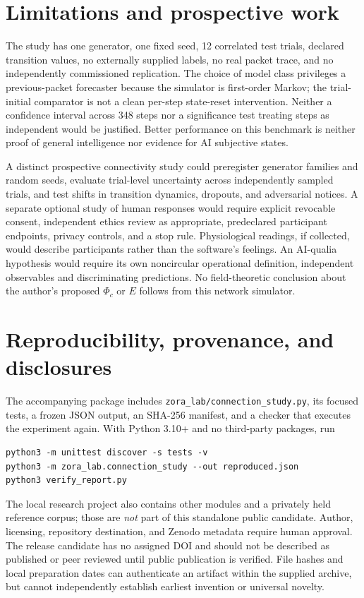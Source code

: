 \documentclass[11pt,a4paper]{article}
\begin{document}
\section{Limitations and prospective work}
The study has one generator, one fixed seed, 12 correlated test trials, declared transition values, no externally supplied labels, no real packet trace, and no independently commissioned replication. The choice of model class privileges a previous-packet forecaster because the simulator is first-order Markov; the trial-initial comparator is not a clean per-step state-reset intervention. Neither a confidence interval across 348 steps nor a significance test treating steps as independent would be justified. Better performance on this benchmark is neither proof of general intelligence nor evidence for AI subjective states.

A distinct prospective connectivity study could preregister generator families and random seeds, evaluate trial-level uncertainty across independently sampled trials, and test shifts in transition dynamics, dropouts, and adversarial notices. A separate optional study of human responses would require explicit revocable consent, independent ethics review as appropriate, predeclared participant endpoints, privacy controls, and a stop rule. Physiological readings, if collected, would describe participants rather than the software's feelings. An AI-qualia hypothesis would require its own noncircular operational definition, independent observables and discriminating predictions. No field-theoretic conclusion about the author's proposed $\Phi_c$ or $E$ follows from this network simulator.

\section{Reproducibility, provenance, and disclosures}
The accompanying package includes \texttt{zora\_lab/connection\_study.py}, its focused tests, a frozen JSON output, an SHA-256 manifest, and a checker that executes the experiment again. With Python 3.10+ and no third-party packages, run
\begin{verbatim}
python3 -m unittest discover -s tests -v
python3 -m zora_lab.connection_study --out reproduced.json
python3 verify_report.py
\end{verbatim}
The local research project also contains other modules and a privately held reference corpus; those are \emph{not} part of this standalone public candidate. Author, licensing, repository destination, and Zenodo metadata require human approval. The release candidate has no assigned DOI and should not be described as published or peer reviewed until public publication is verified. File hashes and local preparation dates can authenticate an artifact within the supplied archive, but cannot independently establish earliest invention or universal novelty.
\end{document}
